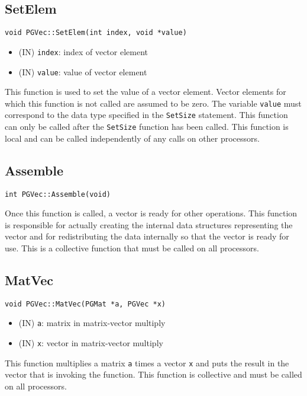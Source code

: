 \documentclass[12pt]{article}
\begin{document}
\subsection{SetElem}
\begin{verbatim}
void PGVec::SetElem(int index, void *value)
\end{verbatim}
\begin{itemize}
\item (IN) \texttt{index}: index of vector element
\item (IN) \texttt{value}: value of vector element
\end{itemize}
This function is used to set the value of a vector element. Vector elements for
which this function is not called are assumed to be zero. The variable \texttt{value}
must correspond to the data type specified in the \texttt{SetSize} statement.
This function can only be called after the \texttt{SetSize} function has been called.
This function is local and can be called independently of any calls on other
processors.
\subsection{Assemble}
\begin{verbatim}
int PGVec::Assemble(void)
\end{verbatim}
Once this function is called, a vector is ready for other operations. This
function is responsible for actually creating the internal data structures
representing the vector and for redistributing the data internally so that the
vector is ready for use. This is a collective function that must be called on
all processors.
\subsection{MatVec}
\begin{verbatim}
void PGVec::MatVec(PGMat *a, PGVec *x)
\end{verbatim}
\begin{itemize}
\item (IN) \texttt{a}: matrix in matrix-vector multiply
\item (IN) \texttt{x}: vector in matrix-vector multiply
\end{itemize}
This function multiplies a matrix \texttt{a} times a vector \texttt{x} and
puts the result in the vector that is invoking the function. This function is
collective and must be called on all processors.
\end{document}
